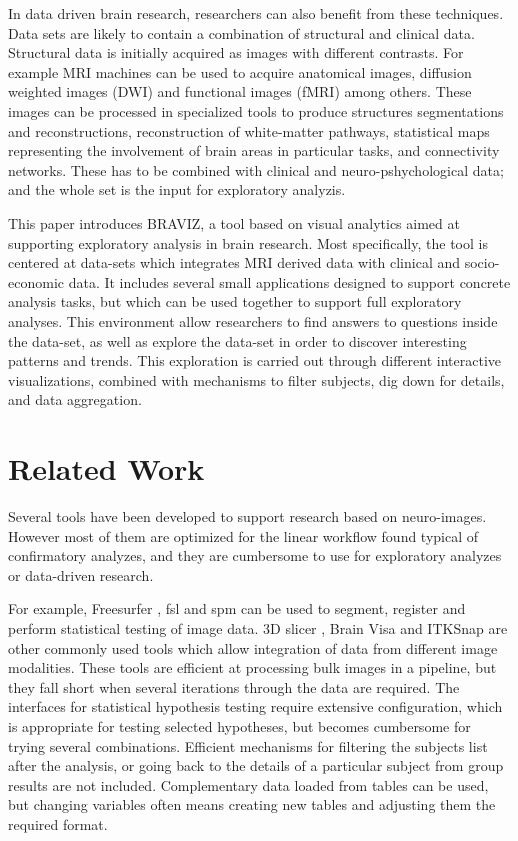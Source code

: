 \documentclass[utf8,paper]{frontiersSCNS} %
\begin{document}
In data driven brain research, researchers can also benefit from these techniques. Data sets are likely to contain a combination of structural and clinical data. Structural data is initially acquired as images with different contrasts. For example MRI machines can be used to acquire anatomical images, diffusion weighted images (DWI) and functional images (fMRI) among others. These images can be processed in specialized tools to produce structures segmentations and reconstructions, reconstruction of white-matter pathways, statistical maps representing the involvement of brain areas in particular tasks, and connectivity networks. These has to be combined with clinical and neuro-pshychological data; and the whole set is the input for exploratory analyzis.

This paper introduces BRAVIZ, a tool based on visual analytics aimed at supporting exploratory analysis in brain research. Most specifically, the tool is centered at data-sets which integrates MRI derived data with clinical and socio-economic data. It includes several small applications designed to support concrete analysis tasks, but which can be used together to support full exploratory analyses. This environment allow researchers to find answers to questions inside the data-set, as well as explore the data-set in order to discover interesting patterns and trends. This exploration is carried out through different interactive visualizations, combined with mechanisms to filter subjects, dig down for details, and data aggregation.



\section{Related Work}

Several tools have been developed to support research based on neuro-images. However most of them are optimized for the linear workflow found typical of confirmatory analyzes, and they are cumbersome to use for exploratory analyzes or data-driven research.

For example, Freesurfer  \citep{fischl_freesurfer_2012}, fsl\citep{jenkinson_fsl_2012} and spm \citep{friston_statistical_2006} can be used to segment, register and perform statistical testing of image data. 3D slicer \citep{fedorov_3d_2012}, Brain Visa \citep{cointepas_brainvisa:_2001} and ITKSnap \citep{yushkevich_user-guided_2006} are other commonly used tools which allow integration of data from different image modalities. These tools are efficient at processing bulk images in a pipeline, but they fall short when several iterations through the data are required. The interfaces for statistical hypothesis testing require extensive configuration, which is appropriate for testing selected hypotheses, but becomes cumbersome for trying several combinations. Efficient mechanisms for filtering the subjects list after the analysis, or going back to the details of a particular subject from group results are not included. Complementary data loaded from tables can be used, but changing variables often means creating new tables and adjusting them the required format.
\end{document}
